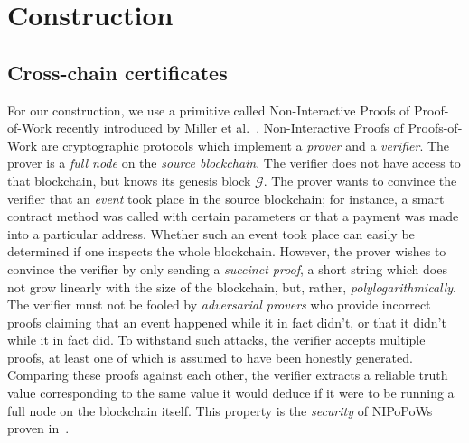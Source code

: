 \section{Construction}
\subsection*{Cross-chain certificates}
For our construction, we use a primitive called Non-Interactive Proofs of
Proof-of-Work recently introduced by Miller et al.~\cite{nipopows}.
Non-Interactive Proofs of Proofs-of-Work are cryptographic protocols which
implement a \emph{prover} and a \emph{verifier}. The prover is a \emph{full
node} on the \emph{source blockchain}. The verifier does not have access to
that blockchain, but knows its genesis block $\mathcal{G}$. The prover wants to
convince the verifier that an \emph{event} took place in the source blockchain;
for instance, a smart contract method was called with certain parameters or that
a payment was made into a particular address. Whether such an event took place
can easily be determined if one inspects the whole blockchain. However, the
prover wishes to convince the verifier by only sending a \emph{succinct proof},
a short string which does not grow linearly  with the size of the blockchain,
but, rather, \emph{polylogarithmically}. The verifier must not be fooled by
\emph{adversarial provers} who provide incorrect proofs claiming that an event
happened while it in fact didn't, or that it didn't while it in fact did. To
withstand such attacks, the verifier accepts multiple proofs, at least one of
which is assumed to have been honestly generated. Comparing these proofs against
each other, the verifier extracts a reliable truth value corresponding to the
same value it would deduce if it were to be running a full node on the
blockchain itself. This property is the \emph{security} of NIPoPoWs proven
in~\cite{nipopows}.

